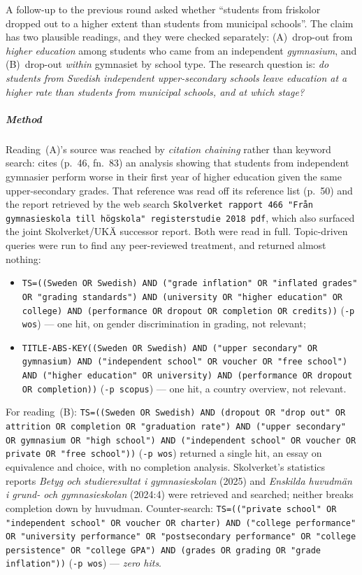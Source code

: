 A follow-up to the previous round asked whether \enquote{students from
friskolor dropped out to a higher extent than students from municipal
schools}.
The claim has two plausible readings, and they were checked separately:
(A)~drop-out from \emph{higher education} among students who came from an
independent \emph{gymnasium}, and (B)~drop-out \emph{within} gymnasiet by
school type.
The research question is: \emph{do students from Swedish independent
upper-secondary schools leave education at a higher rate than students
from municipal schools, and at which stage?}

\subparagraph{Method}
Reading~(A)'s source was reached by \emph{citation chaining} rather than
keyword search: \textcite{Skolverket2020Betyg} cites (p.~46, fn.~83) an
analysis showing that students from independent gymnasier perform worse
in their first year of higher education given the same upper-secondary
grades.  That reference was read off its reference list (p.~50) and the
report retrieved by the web search \texttt{Skolverket rapport 466 "Från
gymnasieskola till högskola" registerstudie 2018 pdf}, which also
surfaced the joint Skolverket/UKÄ successor report.  Both were read in
full.
Topic-driven queries were run to find any peer-reviewed treatment, and
returned almost nothing:
\begin{itemize}
  \item \texttt{TS=((Sweden OR Swedish) AND ("grade inflation" OR
    "inflated grades" OR "grading standards") AND (university OR "higher
    education" OR college) AND (performance OR dropout OR completion OR
    credits))} (\texttt{-p wos}) --- one hit, on gender discrimination in
    grading, not relevant;
  \item \texttt{TITLE-ABS-KEY((Sweden OR Swedish) AND ("upper secondary"
    OR gymnasium) AND ("independent school" OR voucher OR "free school")
    AND ("higher education" OR university) AND (performance OR dropout OR
    completion))} (\texttt{-p scopus}) --- one hit, a country overview,
    not relevant.
\end{itemize}
For reading~(B):
\texttt{TS=((Sweden OR Swedish) AND (dropout OR "drop out" OR attrition
OR completion OR "graduation rate") AND ("upper secondary" OR gymnasium
OR "high school") AND ("independent school" OR voucher OR private OR
"free school"))} (\texttt{-p wos}) returned a single hit, an essay on
equivalence and choice, with no completion analysis.  Skolverket's
statistics reports \emph{Betyg och studieresultat i gymnasieskolan}
(2025) and \emph{Enskilda huvudmän i grund- och gymnasieskolan}
(2024:4) were retrieved and searched; neither breaks completion down by
huvudman.
Counter-search: \texttt{TS=(("private school" OR "independent school" OR
voucher OR charter) AND ("college performance" OR "university
performance" OR "postsecondary performance" OR "college persistence" OR
"college GPA") AND (grades OR grading OR "grade inflation"))}
(\texttt{-p wos}) --- \emph{zero hits}.

